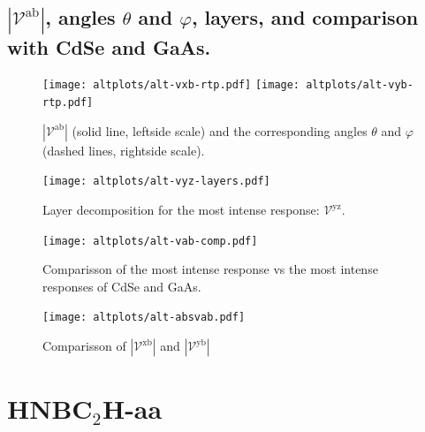 \documentclass{article}
\let\Oldsection\section
\renewcommand{\section}{\FloatBarrier\Oldsection}
\let\Oldsubsection\subsection
\renewcommand{\subsection}{\FloatBarrier\Oldsubsection}
\begin{document}
\subsection{$|\mathcal{V}^{\mathrm{ab}}|$, angles
$\theta$ and $\varphi$, layers, and comparison with CdSe and GaAs.}
\begin{figure}[ht]
    \centering
    \texttt{[image: altplots/alt-vxb-rtp.pdf]}
    \texttt{[image: altplots/alt-vyb-rtp.pdf]}
    \caption{$|\mathcal{V}^{\mathrm{ab}}|$ (solid line, leftside scale) and the
    corresponding angles $\theta$ and $\varphi$ (dashed lines, rightside scale).}
    \label{fig:alt-rtp}
\end{figure}

\begin{figure}[ht]
    \centering
    \texttt{[image: altplots/alt-vyz-layers.pdf]}
    \caption{Layer decomposition for the most intense response:
    $\mathcal{V}^{\mathrm{yz}}$.}
    \label{fig:alt-lay}
\end{figure}

\begin{figure}[ht]
    \centering
    \texttt{[image: altplots/alt-vab-comp.pdf]}
    \caption{Comparisson of the most intense response vs the most intense
    responses of CdSe and GaAs.}
    \label{fig:alt-comp}
\end{figure}

\begin{figure}[ht]
    \centering
    \texttt{[image: altplots/alt-absvab.pdf]}
    \caption{Comparisson of $|\mathcal{V}^{\mathrm{xb}}|$ and $|\mathcal{V}^{\mathrm{yb}}|$}    
    \label{fig:alt-xbybcomp}
\end{figure}




\section{HNBC$_{2}$H-aa} %
\end{document}
